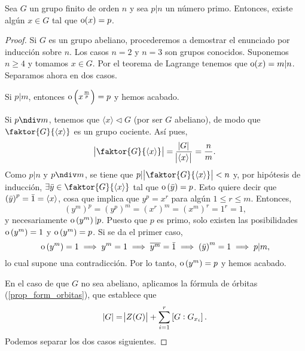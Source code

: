 \begin{teo}\label{teo:cauchy}
    Sea $G$ un grupo finito de orden $n$ y sea $p \vert n$ un número primo. Entonces,
    existe algún $x \in G$ tal que $\operatorname{o}(x) = p$.
\end{teo}
\begin{proof}
    Si $G$ es un grupo abeliano, procederemos a demostrar el enunciado por inducción sobre $n$. Los casos $n=2$ y $n=3$ son grupos conocidos. Suponemos $n \geq 4$ y tomamos $x \in  G$. Por el teorema de Lagrange tenemos que
    $\operatorname{o}(x) = m \vert n$. Separamos ahora en dos casos.
    
    Si $p \vert m$, entonces $\operatorname{o}\left( x^{\frac{m}{p}} \right) = p$ y hemos acabado.

    Si $p \ndiv m$, tenemos que $\langle x\rangle \triangleleft G$ (por ser $G$ abeliano), de modo que
     $\faktor{G}{\langle x\rangle}$ es un grupo cociente. Así pues,
    \[
        \abs{\faktor{G}{\langle x \rangle}} = \frac{\abs{G}}{\abs{\langle x \rangle}} = \frac{n}{m}.
    \]
    Como $p \vert n$ y $p \ndiv m$, se tiene que $p \vert \abs{\faktor{G}{\langle x \rangle}} < n$
    y, por hipótesis de inducción, $\exists \bar{y} \in \faktor{G}{\langle x \rangle}$ tal que
    $\operatorname{o}\left( \bar{y} \right) = p$. Esto quiere decir que $\left(\bar{y}\right) ^p=\bar{1}=\left< x\right>$, cosa que implica que $y^p=x^r$ para algún $1\leq r\leq m$. Entonces,
    \[
        \left( y^m \right)^p = \left( y^p \right)^m = \left( x^r \right)^m = 
        \left( x^m \right)^r = 1^r = 1,
    \]
    y necesariamente $\operatorname{o}\left( y^m \right) \vert p$. Puesto que $p$ es primo, solo existen las posibilidades $\operatorname{o}\left( y^m \right)=1$ y $\operatorname{o}\left( y^m \right)=p$. Si se da el primer caso,
    \[
        \operatorname{o}\left( y^m \right) = 1 \implies y^m = 1 \implies \overline{y^m} = \bar{1} \implies 
        \left( \bar{y} \right)^m = 1 \implies p \vert m,
    \]
    lo cual supone una contradicción. Por lo tanto, $\operatorname{o}\left( y^m \right) = p$ y hemos acabado.

    En el caso de que $G$ no sea abeliano, aplicamos la fórmula de órbitas (\ref{prop_form_orbitas}), que establece que
    \[
        \abs{G} = \abs{Z(G)} + \sum^r_{i=1} \left[ G : G_{x_i} \right].
    \]
    Podemos separar los dos casos siguientes.
    

\end{proof}

